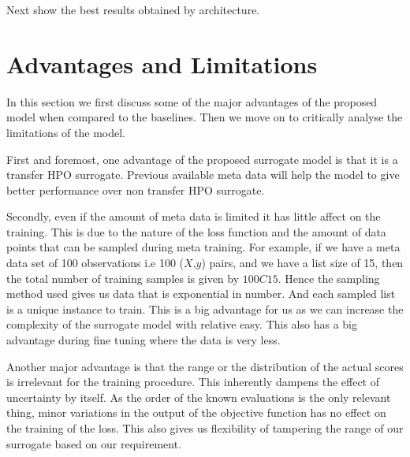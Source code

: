 \documentclass[12pt, twoside, ngerman]{report}
\begin{document}
Next show the best results obtained by architecture.
\fi

\section{Advantages and Limitations}
\label{sec:advantagesAndLimitations}

In this section we first discuss some of the major advantages of the proposed model when compared to the baselines.
Then we move on to critically analyse the limitations of the model.

First and foremost,  one advantage of the proposed surrogate model is that it is a transfer HPO surrogate.  Previous available meta data will help the model to give better performance over non transfer HPO surrogate.

Secondly,  even if the amount of meta data is limited it has little affect on the training.
This is due to the nature of the loss function and the amount of data points that can be sampled during meta training.
For example,  if we have a meta data set of 100 observations i.e 100 ($X$,$y$) pairs,  and we have a list size of 15,  then the total number of training samples is given by $100C15$.
Hence the sampling method used gives us data that is exponential in number.
And each sampled list is a unique instance to train.
This is a big advantage for us as we can increase the complexity of the surrogate model with relative easy.
This also has a big advantage during fine tuning where the data is very less.

Another major advantage is that the range or the distribution of the actual scores is irrelevant for the training procedure.
This inherently dampens the effect of uncertainty by itself.
As the order of the known evaluations is the  only relevant thing,  minor variations in the output of the objective function has no effect on the training of the loss.
This also gives us flexibility of tampering the range of our surrogate based on our requirement.
\end{document}

